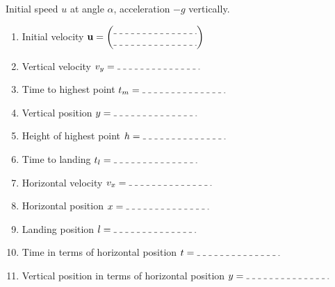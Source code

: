 \documentclass[17pt]{extarticle}
\newcommand\qline{\tikz[dashed] \draw (0,0) -- +(3,0);}
\let\vec=\mathbf
\begin{document}
Initial speed \(u\) at angle \(\alpha\), acceleration \(-g\) vertically.

\begin{multicols}{2}

\begin{enumerate}
\item Initial velocity \(\vec{u} = \begin{pmatrix} \qline \\ \qline \end{pmatrix}\)
\item Vertical velocity \(v_y = \qline\)
\item Time to highest point \(t_m = \qline\)
\item Vertical position \(y = \qline\)
\item Height of highest point \(h = \qline\)
\item Time to landing \(t_l = \qline\)
\item Horizontal velocity \(v_x = \qline\)
\item Horizontal position \(x = \qline\)
\item Landing position \(l = \qline\)
\item Time in terms of horizontal position \(t = \qline\)
\item Vertical position in terms of horizontal position \(y = \qline\)
\end{enumerate}

\end{multicols}
\end{document}

